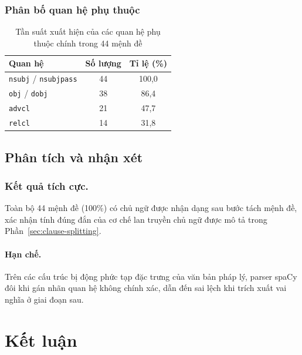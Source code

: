 \subsubsection{Phân bố quan hệ phụ thuộc}

\begin{table}[H]
    \centering
    \caption{Tần suất xuất hiện của các quan hệ phụ thuộc chính trong 44 mệnh đề}
    \label{tab:dep-stats}
    \begin{tabular}{|l|c|c|}
        \hline
        \textbf{Quan hệ} & \textbf{Số lượng} & \textbf{Tỉ lệ (\%)} \\
        \hline
        \texttt{nsubj} / \texttt{nsubjpass} & 44 & 100{,}0 \\
        \texttt{obj} / \texttt{dobj}        & 38 &  86{,}4 \\
        \texttt{advcl}                      & 21 &  47{,}7 \\
        \texttt{relcl}                      & 14 &  31{,}8 \\
        \hline
    \end{tabular}
\end{table}

\subsection{Phân tích và nhận xét}

\subsubsection{Kết quả tích cực.}
Toàn bộ 44 mệnh đề (100\%) có chủ ngữ được nhận dạng sau bước tách
mệnh đề, xác nhận tính đúng đắn của cơ chế lan truyền chủ ngữ được mô
tả trong Phần~\ref{sec:clause-splitting}.

\paragraph{Hạn chế.}
Trên các cấu trúc bị động phức tạp đặc trưng của văn bản pháp lý,
parser spaCy đôi khi gán nhãn quan hệ không chính xác, dẫn đến sai
lệch khi trích xuất vai nghĩa ở giai đoạn sau.

\section{Kết luận}
\label{sec:conclusion}

